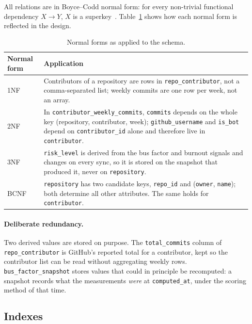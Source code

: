 \documentclass[11pt,a4paper]{report}
\begin{document}
All relations are in Boyce--Codd normal form: for every non-trivial functional
dependency $X \rightarrow Y$, $X$ is a superkey~\cite{codd1970relational,silberschatz2019db,elmasri2016fundamentals}.
Table~\ref{tab:nf} shows how each normal form is reflected in the design.

\begin{table}[H]
\centering
\caption{Normal forms as applied to the schema.}
\label{tab:nf}
\small
\begin{tabularx}{\textwidth}{l X}
\toprule
\textbf{Normal form} & \textbf{Application} \\
\midrule
1NF & Contributors of a repository are rows in \texttt{repo\_contributor}, not a
comma-separated list; weekly commits are one row per week, not an array. \\
2NF & In \texttt{contributor\_weekly\_commits}, \texttt{commits} depends on the
whole key (repository, contributor, week); \texttt{github\_username} and
\texttt{is\_bot} depend on \texttt{contributor\_id} alone and therefore live in
\texttt{contributor}. \\
3NF & \texttt{risk\_level} is derived from the bus factor and burnout signals and
changes on every sync, so it is stored on the snapshot that produced it, never
on \texttt{repository}. \\
BCNF & \texttt{repository} has two candidate keys, \texttt{repo\_id} and
(\texttt{owner}, \texttt{name}); both determine all other attributes. The same
holds for \texttt{contributor}. \\
\bottomrule
\end{tabularx}
\end{table}

\paragraph{Deliberate redundancy.} Two derived values are stored on purpose.
The \texttt{total\_commits} column of \texttt{repo\_contributor} is GitHub's
reported total for a contributor, kept so the contributor list can be read
without aggregating weekly rows. \texttt{bus\_factor\_snapshot} stores values that could in
principle be recomputed: a snapshot records what the measurements \emph{were}
at \texttt{computed\_at}, under the scoring method of that time.

\subsection{Indexes}
\end{document}
